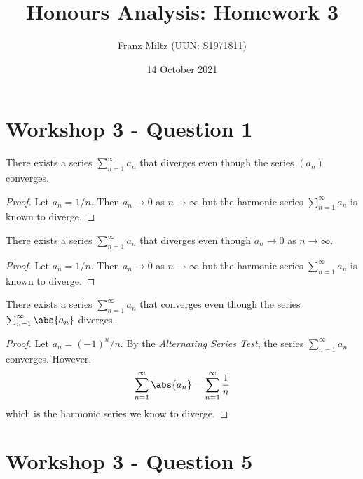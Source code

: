 \documentclass{article}
\begin{document}
\title{Honours Analysis: Homework 3}
\author{Franz Miltz (UUN: S1971811)}
\date{14 October 2021}
\maketitle

\section{Workshop 3 - Question 1}

\begin{claim}
   There exists a series $\sum_{n=1}^\infty a_n$ that diverges even though the
   series $(a_n)$ converges.
\end{claim}
\begin{proof}
   Let $a_n=1/n$. Then $a_n\to 0$ as $n\to\infty$ but the harmonic series
   $\sum_{n=1}^\infty a_n$ is known to diverge.
\end{proof}

\begin{claim}
   There exists a series $\sum_{n=1}^\infty a_n$ that diverges even though
   $a_n\to 0$ as $n\to\infty$.
\end{claim}
\begin{proof}
   Let $a_n=1/n$. Then $a_n\to 0$ as $n\to\infty$ but the harmonic series
   $\sum_{n=1}^\infty a_n$ is known to diverge.
\end{proof}

\begin{claim}
   There exists a series $\sum_{n=1}^\infty a_n$ that converges even though
   the series $\sum_{n=1}^\infty \abs{a_n}$ diverges.
\end{claim}
\begin{proof}
   Let $a_n=(-1)^n/n$. By the \emph{Alternating Series Test}, the series $\sum_{n=1}^\infty a_n$
   converges. However,
   \begin{align}
      \sum_{n=1}^\infty \abs{a_n} = \sum_{n=1}^\infty \frac{1}{n}
   \end{align}
   which is the harmonic series we know to diverge.
\end{proof}

\section{Workshop 3 - Question 5}
\end{document}
